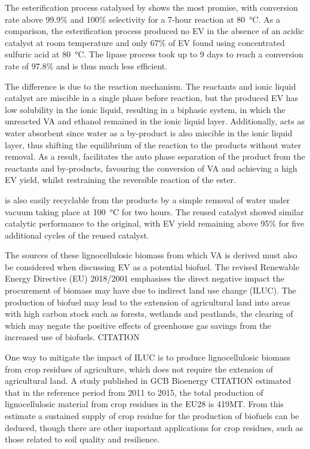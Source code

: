 \documentclass[11pt]{article}
\begin{document}
The esterification process catalysed by  shows the most promise, with conversion rate above 99.9\% and 100\% selectivity for a 7-hour reaction at \SI{80}{\celsius}. As a comparison, the esterification process produced no EV in the absence of an acidic catalyst at room temperature and only 67\% of EV found using concentrated sulfuric acid at \SI{80}{\celsius}. The lipase process took up to 9 days to reach a conversion rate of 97.8\% and is thus much less efficient. 

The difference is due to the reaction mechanism. The reactants and ionic liquid catalyst are miscible in a single phase before reaction, but the produced EV has low solubility in the ionic liquid, resulting in a biphasic system, in which the unreacted VA and ethanol remained in the ionic liquid layer. Additionally,  acts as water absorbent since water as a by-product is also miscible in the ionic liquid layer, thus shifting the equilibrium of the reaction to the products without water removal. As a result,  facilitates the auto phase separation of the product from the reactants and by-products, favouring the conversion of VA and achieving a high EV yield, whilst restraining the reversible reaction of the ester. 

 is also easily recyclable from the products by a simple removal of water under vacuum taking place at \SI{100}{\celsius} for two hours. The reused catalyst showed similar catalytic performance to the original, with EV yield remaining above 95\% for five additional cycles of the reused catalyst.   

The sources of these lignocellulosic biomass from which VA is derived must also be considered when discussing EV as a potential biofuel. The revised Renewable Energy Directive (EU) 2018/2001 emphasises the direct negative impact the procurement of biomass may have due to indirect land use change (ILUC). The production of biofuel may lead to the extension of agricultural land into areas with high carbon stock such as forests, wetlands and peatlands, the clearing of which may negate the positive effects of greenhouse gas savings from the increased use of biofuels. CITATION

One way to mitigate the impact of ILUC is to produce lignocellulosic biomass from crop residues of agriculture, which does not require the extension of agricultural land. A study published in GCB Bioenergy CITATION estimated that in the reference period from 2011 to 2015, the total production of lignocellulosic material from crop residues in the EU28 is 419MT. From this estimate a sustained supply of crop residue for the production of biofuels can be deduced, though there are other important applications for crop residues, such as those related to soil quality and resilience.  
\end{document}
